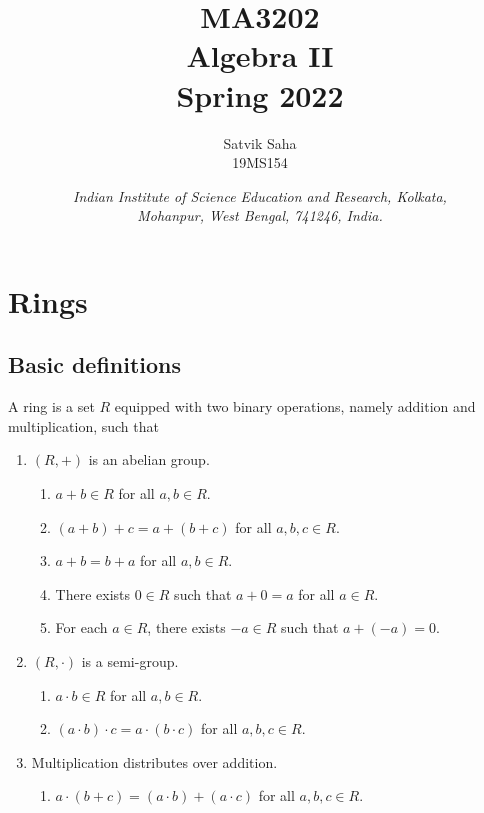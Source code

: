 \documentclass[11pt]{article}
\title{
    \Large\textsc{MA3202} \\
    \Huge \textbf{Algebra II} \\
    \vspace{5pt}
    \Large{Spring 2022}
}
\author{
    \large Satvik Saha
    \\\textsc{\small 19MS154}
}
\date{\normalsize
    \textit{Indian Institute of Science Education and Research, Kolkata, \\
    Mohanpur, West Bengal, 741246, India.} \\
}
\theoremstyle{definition}
\theoremstyle{remark}
\numberwithin{equation}{section}
\begin{document}
    \maketitle

    \tableofcontents

    \section{Rings}
    
    \subsection{Basic definitions}
    \begin{definition}
        A ring is a set $R$ equipped with two binary operations, namely addition and
        multiplication, such that 
        \begin{enumerate}
            \itemsep0em
            \item $(R, +)$ is an abelian group.
            \begin{enumerate}
                \itemsep0em
                \item $a + b \in R$ for all $a, b \in R$.
                \item $(a + b) + c = a + (b + c)$ for all $a, b, c \in R$.
                \item $a + b = b + a$ for all $a, b \in R$.
                \item There exists $0 \in R$ such that $a + 0 = a$ for all $a \in R$.
                \item For each $a \in R$, there exists $-a \in R$ such that $a + (-a)
                = 0$.
            \end{enumerate}
            \item $(R, \cdot)$ is a semi-group.
            \begin{enumerate}
                \itemsep0em
                \item $a\cdot b \in R$ for all $a, b \in R$.
                \item $(a\cdot b)\cdot c = a\cdot(b\cdot c)$ for all $a, b, c \in R$.
            \end{enumerate}
            \item Multiplication distributes over addition.
            \begin{enumerate}
                \itemsep0em
                \item $a\cdot (b + c) = (a\cdot b) + (a\cdot c)$ for all $a, b, c \in R$.

\end{enumerate}
\end{enumerate}
\end{definition}
\end{document}
